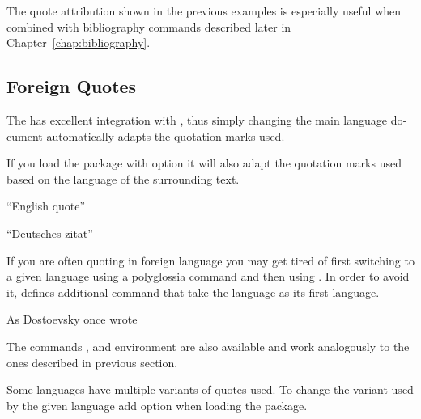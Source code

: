 The quote attribution shown in the previous examples is especially useful when
combined with bibliography commands described later in
Chapter~\ref{chap:bibliography}.

\subsection{Foreign Quotes}

The  has excellent integration with , thus
simply changing the main language document automatically adapts the quotation
marks used.
\begin{example}
\setmainlanguage{french}

\end{example}

If you load the package with  option it will also adapt the
quotation marks used based on the language of the surrounding text.
\begin{example}
\usepackage[autostyle]{csquotes}

\enquote{English quote}

\begin{german}
  \enquote{Deutsches zitat}
\end{german}
\end{example}

If you are often quoting in foreign language you may get tired of first
switching to a given language using a polyglossia command and then using
. In order to avoid it,  defines additional
 command that take the language as its first language.
\begingroup
\setmonofont{cmuntt.otf}
\begin{example}
As Dostoevsky once wrote
\textrussian{}
\end{example}
\endgroup
The commands ,  and environment
 are also available and work analogously to the ones
described in previous section.

Some languages have multiple variants of quotes used. To change the variant
used by the given language add option 
when loading the  package.
\begin{example}
\usepackage[
  autostyle,
  german=guillemets,
]{csquotes}

\end{example}

